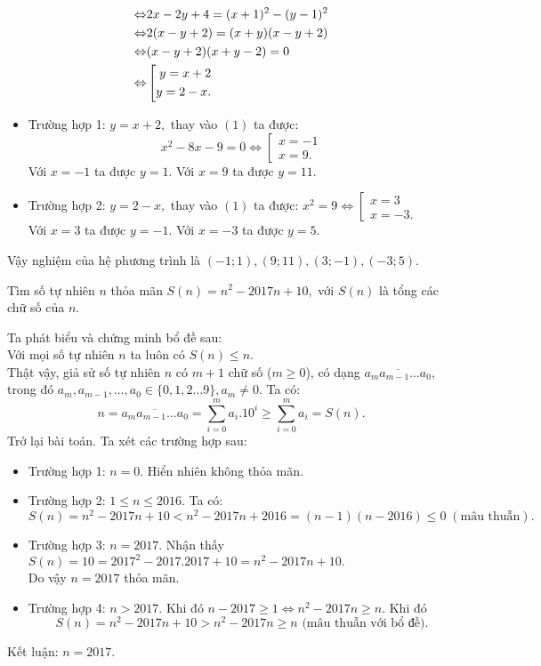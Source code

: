 \begin{ex}
{\begin{enumerate}
{\begin{align*}
        \Leftrightarrow&2x-2y+4=(x+1)^2-(y-1)^2\\
        \Leftrightarrow&2(x-y+2)=(x+y)(x-y+2)\\
        \Leftrightarrow&(x-y+2)(x+y-2)=0\\
        \Leftrightarrow&\left[\begin{aligned}y=x+2\\y=2-x.\end{aligned}\right.\end{align*}}
        \begin{itemize}
        	\item Trường hợp 1:  $y=x+2,$ thay vào $(1)$ ta được: 
        	$$ x^2-8x-9=0\Leftrightarrow \left[ \begin{array}{l}
        	x =  - 1\\
        	x = 9.
        	\end{array} \right.$$
        Với $x=-1$ ta được $y=1$. Với $x=9$ ta được $y=11$.
        	\item Trường hợp 2: $y=2-x,$ thay vào $(1)$ ta được:
        	$x^2=9\Leftrightarrow\left[ \begin{array}{l}
        	x =  3\\
        	x = -3.
        	\end{array} \right.$\\
        Với $x=3$ ta được $y=-1$. Với $x=-3$ ta được $y=5$.
        \end{itemize}
        Vậy nghiệm của hệ phương trình là $(-1;1),(9;11),(3;-1),(-3;5).$
    \end{enumerate}
    }
\end{ex}

\begin{ex}%
Tìm số tự nhiên $n$ thỏa mãn $S(n)=n^2-2017n+10,$ với $S(n)$ là tổng các chữ số của $n$.
\loigiai
    {Ta phát biểu và chứng minh bổ đề sau:\\
  Với mọi số tự nhiên $n$ ta luôn có $S(n)\le n$. \\
   	Thật vậy, giả sử số tự nhiên $n$ có $m+1$ chữ số ($m\ge 0$), có dạng $\overline{a_ma_{m-1}\ldots a_0}$, trong đó $a_m,a_{m-1},\ldots ,a_0\in\{0,1,2\dots9\} , a_m\ne 0.$
  Ta có: 
  	$$n=\overline{a_ma_{m-1}\ldots a_0}
  	=\displaystyle\sum_{i=0}^{m}a_i.10^i\ge \displaystyle\sum_{i=0}^{m}a_i=S(n).$$
Trở lại bài toán. Ta xét các trường hợp sau:
\begin{itemize}
	\item Trường hợp 1: $n=0$. Hiển nhiên không thỏa mãn.
	\item Trường hợp 2: $1\le n\le 2016.$ Ta có:
	$$S(n)=n^2-2017n+10<n^2-2017n+2016=(n-1)(n-2016)\le 0 \;(\text{mâu thuẫn}).$$  
	\item Trường hợp 3: $n=2017$. Nhận thấy $S(n)=10=2017^2-2017.2017+10=n^2-2017n+10.$ \\Do vậy $n=2017$ thỏa mãn.
	\item Trường hợp 4: $n>2017.$ Khi đó $n-2017\ge 1\Leftrightarrow n^2-2017n\ge n$. Khi đó
	$$S(n)=n^2-2017n+10>n^2-2017n\ge n \,\, \text{(mâu thuẫn với bổ đề).}$$
\end{itemize}
Kết luận: $n=2017.$
    }
\end{ex}

